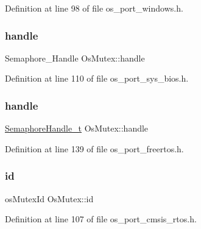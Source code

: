 Definition at line 98 of file os\+\_\+port\+\_\+windows.\+h.

\mbox{\label{structOsMutex_a3364c1497395134037e83e150bfc2757}} 
\subsubsection{\texorpdfstring{handle}{handle}\hspace{0.1cm}{\footnotesize\ttfamily [2/3]}}
{\footnotesize\ttfamily Semaphore\+\_\+\+Handle Os\+Mutex\+::handle}



Definition at line 110 of file os\+\_\+port\+\_\+sys\+\_\+bios.\+h.

\mbox{\label{structOsMutex_a6e65c1dc7f7a14067f7c8a9d7b646f07}} 
\subsubsection{\texorpdfstring{handle}{handle}\hspace{0.1cm}{\footnotesize\ttfamily [3/3]}}
{\footnotesize\ttfamily \hyperlink{semphr_8h_ad88c6df4a04beedeac782918c8a332f5}{Semaphore\+Handle\+\_\+t} Os\+Mutex\+::handle}



Definition at line 139 of file os\+\_\+port\+\_\+freertos.\+h.

\mbox{\label{structOsMutex_ae52709d6235dc8132a937fe9a1518878}} 
\subsubsection{\texorpdfstring{id}{id}\hspace{0.1cm}{\footnotesize\ttfamily [1/2]}}
{\footnotesize\ttfamily os\+Mutex\+Id Os\+Mutex\+::id}



Definition at line 107 of file os\+\_\+port\+\_\+cmsis\+\_\+rtos.\+h.

\mbox{\label{structOsMutex_a58158c64389eba6006108f0ecb4578a8}} 
